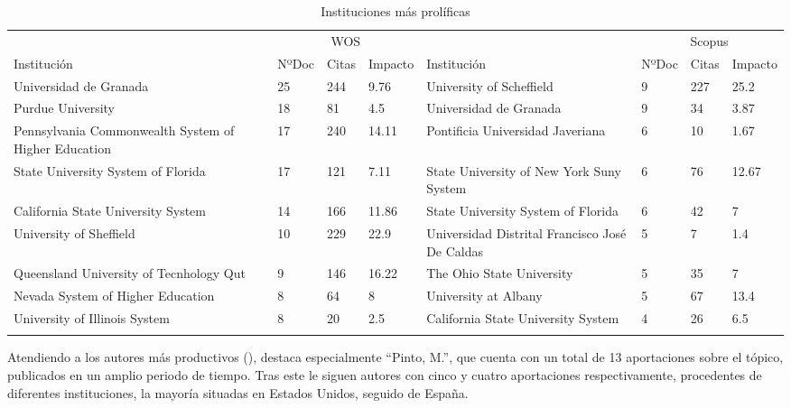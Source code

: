 \documentclass[spanish]{textolivre}
\begin{document}
\begin{table}[h]
\caption{Instituciones más prolíficas}
\label{tab3}
\centering
\scriptsize
\begin{tabular}{%
    >{\raggedright\arraybackslash}p{}%
    p{}%
    p{}%
    p{}%
    >{\raggedright\arraybackslash}p{}%
    p{}%
    p{}%
    p{}}
\toprule 
& \multicolumn{3}{c}{WOS} & & \multicolumn{3}{c}{Scopus}
\\
Institución	& NºDoc & Citas & Impacto & Institución & NºDoc & Citas & Impacto
\\
\midrule
\arrayrulecolor[gray]{.7}
Universidad de Granada & 25 & 244 & 9.76 & University of Scheffield & 9 & 227 & 25.2
\\
Purdue University & 18 & 81 & 4.5 & Universidad de Granada & 9 & 34 & 3.87
\\
Pennsylvania Commonwealth System of Higher Education & 17 & 240 & 14.11 & Pontificia Universidad Javeriana & 6 & 10 & 1.67
\\
State University System of Florida & 17 & 121 & 7.11 & State University of New York Suny System & 6 & 76 & 12.67
\\
California State University System & 14 & 166 & 11.86 & State University System of Florida & 6 & 42 & 7
\\
University of Sheffield & 10 & 229 & 22.9 & Universidad Distrital Francisco José De Caldas & 5 & 7 & 1.4
\\
Queensland University of Tecnhology Qut & 9 & 146 & 16.22 & The Ohio State University & 5 & 35 & 7
\\
Nevada System of Higher Education & 8 & 64 & 8 & University at Albany & 5 & 67 & 13.4
\\
University of Illinois System & 8 & 20 & 2.5 & California State University System & 4 & 26 & 6.5
\\
\arrayrulecolor{black}
\bottomrule
\end{tabular}
\centering
{}
\end{table}

Atendiendo a los autores más productivos (), destaca especialmente “Pinto, M.”, que cuenta con un total de 13 aportaciones sobre el tópico, publicados en un amplio periodo de tiempo. Tras este le siguen autores con cinco y cuatro aportaciones respectivamente, procedentes de diferentes instituciones, la mayoría situadas en Estados Unidos, seguido de España.
\end{document}
